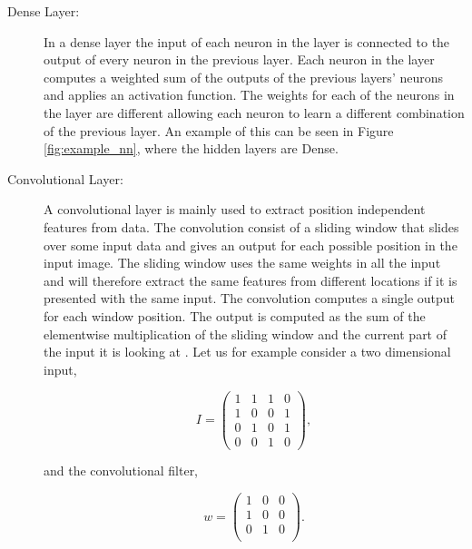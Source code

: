 \begin{description}

    \item[Dense Layer:]

        In a dense layer the input of each neuron in the layer is connected to
        the output of every neuron in the previous layer. Each neuron in the
        layer computes a weighted sum of the outputs of the previous layers'
        neurons and applies an activation function. The weights for each of
        the neurons in the layer are different allowing each neuron to learn a
        different combination of the previous layer. An example of this can be
        seen in Figure \ref{fig:example_nn}, where the hidden layers are Dense.

    \item[Convolutional Layer:]

        A convolutional layer is mainly used to extract position independent
        features from data. The convolution consist of a sliding window that
        slides over some input data and gives an output for each possible
        position in the input image. The sliding window uses the same weights
        in all the input and will therefore extract the same features from
        different locations if it is presented with the same input. The
        convolution computes a single output for each window position. The
        output is computed as the sum of the elementwise multiplication of
        the sliding window and the current part of the input it is looking at
        \citep{oshea2015}. Let us for example consider a two dimensional input,

        \begin{equation}
            I = \begin{pmatrix}
                1 & 1 & 1 & 0 \\
                1 & 0 & 0 & 1 \\
                0 & 1 & 0 & 1 \\
                0 & 0 & 1 & 0
            \end{pmatrix},
        \end{equation}

        and the convolutional filter,

        \begin{equation}
            w = \begin{pmatrix}
                1 & 0 & 0 \\
                1 & 0 & 0 \\
                0 & 1 & 0 \\
            \end{pmatrix}.
        \end{equation}


\end{description}
